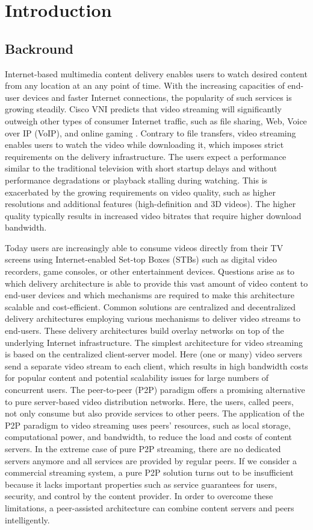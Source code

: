 \chapter{Introduction}
\section{Backround}
Internet-based multimedia content delivery enables users to watch desired content from any location at an any point of time. 
With the increasing capacities of end-user devices and faster Internet connections, the popularity of such services is growing steadily. 
Cisco VNI predicts that video streaming will significantly outweigh other types of consumer Internet traffic, such as file sharing, Web, Voice over IP (VoIP), and online gaming \cite{ciscovni}. 
Contrary to file transfers, video streaming enables users to watch the video while downloading it, which imposes strict requirements on the delivery infrastructure. 
The users expect a performance similar to the traditional television with short startup delays and without performance degradations or playback stalling during watching. This is exacerbated by the growing requirements on video quality, such as higher resolutions and additional features (high-definition and 3D videos). 
The higher quality typically results in increased video bitrates that require higher download bandwidth.

Today users are increasingly able to consume videos directly from their TV screens using Internet-enabled Set-top Boxes (STBs) such as digital video recorders, game consoles, or other entertainment devices. 
Questions arise as to which delivery architecture is able to provide this vast amount of video content to end-user devices and which mechanisms are required to make this architecture scalable and cost-efficient. 
Common solutions are centralized and decentralized delivery architectures employing various mechanisms to deliver video streams to end-users. 
These delivery architectures build overlay networks on top of the underlying Internet infrastructure.
The simplest architecture for video streaming is based on the centralized client-server model. Here (one or many) video servers send a separate video stream to each client, which results in high bandwidth costs for popular content and potential scalability issues for large numbers of concurrent users. 
The peer-to-peer (P2P) paradigm offers a promising alternative to pure server-based video distribution networks. 
Here, the users, called peers, not only consume but also provide services to other peers. The application of the P2P paradigm to video streaming uses peers’ resources, such as local storage, computational power, and bandwidth, to reduce the load and costs of content servers. In the extreme case of pure P2P streaming, there are no dedicated servers anymore and all services are provided by regular peers.
If we consider a commercial streaming system, a pure P2P solution turns out to be insufficient because it lacks important properties such as service guarantees for users, security, and control by the content provider. 
In order to overcome these limitations, a peer-assisted architecture can combine content servers and peers intelligently.

